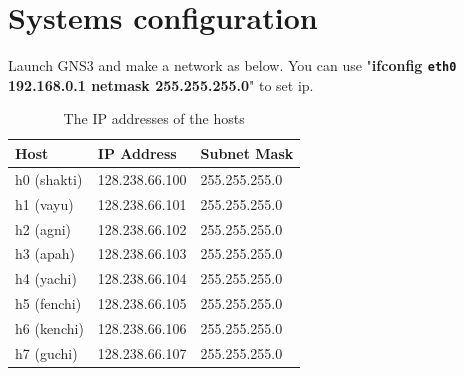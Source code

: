 \documentclass[10pt,a4paper]{article}
\numberwithin{equation}{section}
\numberwithin{figure}{section}
\numberwithin{table}{section}
\begin{document}
\section*{Systems configuration}
Launch GNS3 and make a network as below. You can use "\textbf{ifconfig \texttt{eth0} 192.168.0.1 netmask 255.255.255.0}" to set ip.
\begin{center}
    \begin{minipage}{0.48\textwidth}
        \begin{flushleft}
            \begin{table}[H]
                \caption{The IP addresses of the hosts}
                \vspace{5pt}
                \centering
                \begin{tabular}{ l l l }
                    \hline \hline
                    Host & IP Address & Subnet Mask \\
                    \hline 
                    h0 (shakti) & 128.238.66.100 & 255.255.255.0 \\
                    h1 (vayu) & 128.238.66.101 & 255.255.255.0 \\
                    h2 (agni) & 128.238.66.102 & 255.255.255.0 \\
                    h3 (apah) & 128.238.66.103 & 255.255.255.0 \\
                    h4 (yachi) & 128.238.66.104 & 255.255.255.0 \\
                    h5 (fenchi) & 128.238.66.105 & 255.255.255.0 \\
                    h6 (kenchi) & 128.238.66.106 & 255.255.255.0 \\
                    h7 (guchi) & 128.238.66.107 & 255.255.255.0 \\
                    \hline \hline
                    \end{tabular}
            \end{table}
        \end{flushleft}
    \end{minipage}
    \begin{minipage}{0.48\textwidth}
        \begin{flushright}
            \begin{figure}[H]
                \centering
\end{figure}
\end{flushright}
\end{minipage}
\end{center}
\end{document}
